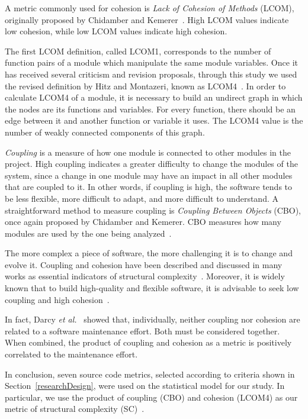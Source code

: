 \documentclass[conference]{IEEEtran}
\begin{document}
%
A metric commonly used for cohesion is \emph{Lack of Cohesion of
Methods} (LCOM), originally proposed by Chidamber and Kemerer~\cite{Chidamber94}.
High LCOM values indicate low cohesion, while low LCOM values indicate high cohesion.

The first LCOM definition, called LCOM1, corresponds to
the number of function pairs of a module which manipulate the same module variables.
Once it has received several criticism and revision proposals, through this study we used 
the revised definition by Hitz and Montazeri, known as LCOM4~\cite{LCOM4}.
%
In order to calculate LCOM4 of a module, it is necessary to build an undirect graph in
which the nodes are its functions and variables. For every function, there should be
an edge between it and another function or variable it uses. The LCOM4 value is the number
of weakly connected components of this graph.

\emph{Coupling} is a measure of how one module is connected to other modules
in the project.
%
High coupling indicates a greater difficulty to change the
modules of the system, since a change in one module may have an impact in
all other modules that are coupled to it.
%
In other words, if coupling is high, the software tends to be less flexible,
more difficult to adapt, and more difficult to understand.
%
A straightforward method to measure coupling is \emph{Coupling Between Objects} (CBO),
once again proposed by Chidamber and Kemerer. CBO measures how many modules are
used by the one being analyzed~\cite{Chidamber94}.

The more complex a piece of software, the more challenging it is to change and
evolve it. Coupling and cohesion have been described and discussed in
many works as essential indicators of structural complexity~\cite{darcy2005}.
Moreover, it is widely known that to build high-quality and flexible software, 
it is advisable to seek low coupling and high cohesion~\cite{richter99}.

In fact, Darcy \emph{et al.}~\cite{darcy2005} showed that, individually, neither
coupling nor cohesion are related to a software maintenance effort. Both must be considered together.
When combined, the product of coupling and cohesion as a metric is positively correlated to
the maintenance effort.

In conclusion, seven source code metrics, selected according to criteria shown 
in Section~\ref{researchDesign}, were used on the statistical model for our study.
%
In particular, we use the product of coupling (CBO) and cohesion (LCOM4) as
our metric of structural complexity (SC)~\cite{darcy2005}.
\end{document}
